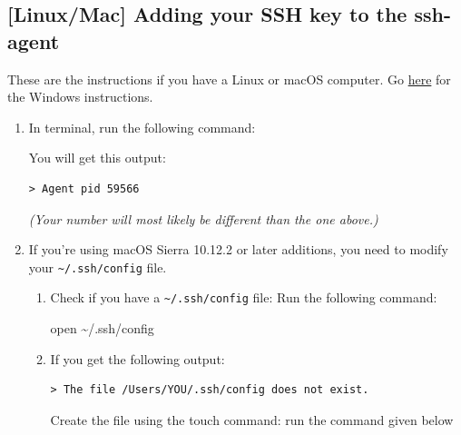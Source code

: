 \documentclass[
]{book}
\newenvironment{Shaded}{\begin{snugshade}}{\end{snugshade}}
\newcommand{\AttributeTok}[1]{\textcolor[rgb]{0.13,0.29,0.53}{#1}}
\newcommand{\BuiltInTok}[1]{#1}
\newcommand{\ExtensionTok}[1]{#1}
\newcommand{\FunctionTok}[1]{\textcolor[rgb]{0.13,0.29,0.53}{\textbf{#1}}}
\newcommand{\NormalTok}[1]{#1}
\newcommand{\StringTok}[1]{\textcolor[rgb]{0.31,0.60,0.02}{#1}}
\newcommand{\VariableTok}[1]{\textcolor[rgb]{0.00,0.00,0.00}{#1}}
\theoremstyle{definition}
\theoremstyle{definition}
\theoremstyle{definition}
\theoremstyle{definition}
\theoremstyle{remark}
\begin{document}
\subsection{{[}Linux/Mac{]} Adding your SSH key to the ssh-agent}\label{linuxmac-adding-your-ssh-key-to-the-ssh-agent}

These are the instructions if you have a Linux or macOS computer. Go \hyperref[windows-add-ssh-key]{here} for the Windows instructions.

\begin{enumerate}
\def\labelenumi{\arabic{enumi}.}
\item
  In terminal, run the following command:

\begin{Shaded}
\end{Shaded}

  You will get this output:

\begin{verbatim}
> Agent pid 59566
\end{verbatim}

  \emph{(Your number will most likely be different than the one above.)}
\item
  If you're using macOS Sierra 10.12.2 or later additions, you need to modify your \texttt{\textasciitilde{}/.ssh/config} file.

  \begin{enumerate}
  \def\labelenumii{\arabic{enumii}.}
  \item
    Check if you have a \texttt{\textasciitilde{}/.ssh/config} file: Run the following command:

\begin{Shaded}
\begin{Highlighting}[]
\ExtensionTok{open}\NormalTok{ \textasciitilde{}/.ssh/config}
\end{Highlighting}
\end{Shaded}
  \item
    If you get the following output:

\begin{verbatim}
> The file /Users/YOU/.ssh/config does not exist.
\end{verbatim}

    Create the file using the touch command: run the command given below


\end{enumerate}
\end{enumerate}
\end{document}
